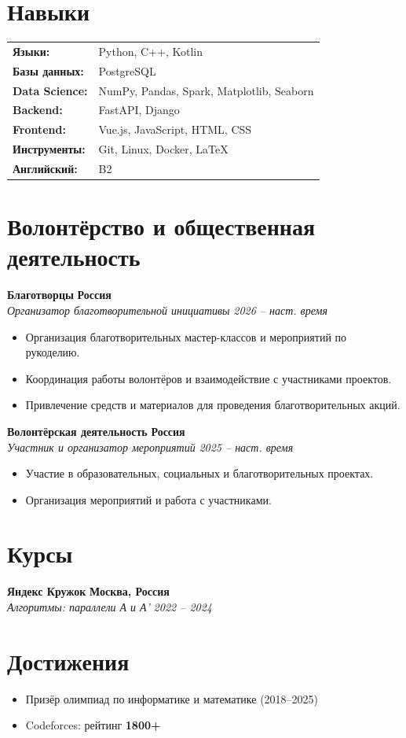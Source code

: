 \documentclass[11pt,a4paper]{article}
\newcommand{\cvevent}[4]{%
  \vspace{3pt}
  \noindent
  {\bfseries\large #1} \hfill {\bfseries #4}\\
  {\color{lighttext}\textit{#2}} \hfill {\color{lighttext}\textit{#3}}
  \vspace{1pt}
}
\begin{document}
\section{Навыки}

\begin{tabularx}{\textwidth}{@{}lX@{}}
  {\color{lighttext}\textbf{Языки:}} & Python, C++, Kotlin \\
  {\color{lighttext}\textbf{Базы данных:}} & PostgreSQL \\
  {\color{lighttext}\textbf{Data Science:}} & NumPy, Pandas, Spark, Matplotlib, Seaborn \\
  {\color{lighttext}\textbf{Backend:}} & FastAPI, Django \\
  {\color{lighttext}\textbf{Frontend:}} & Vue.js, JavaScript, HTML, CSS \\
  {\color{lighttext}\textbf{Инструменты:}} & Git, Linux, Docker, LaTeX \\
  {\color{lighttext}\textbf{Английский:}} & B2 \\
\end{tabularx}

\section{Волонтёрство и общественная деятельность}

\cvevent{Благотворцы}{Организатор благотворительной инициативы}{2026 -- наст. время}{Россия}
\begin{itemize}
  \item Организация благотворительных мастер-классов и мероприятий по рукоделию.
  \item Координация работы волонтёров и взаимодействие с участниками проектов.
  \item Привлечение средств и материалов для проведения благотворительных акций.
\end{itemize}

\cvevent{Волонтёрская деятельность}{Участник и организатор мероприятий}{2025 -- наст. время}{Россия}
\begin{itemize}
  \item Участие в образовательных, социальных и благотворительных проектах.
  \item Организация мероприятий и работа с участниками.
\end{itemize}

\section{Курсы}

\cvevent{Яндекс Кружок}{Алгоритмы: параллели А и А'}{2022 -- 2024}{Москва, Россия}

\section{Достижения}

\begin{itemize}
  \item Призёр олимпиад по информатике и математике (2018--2025)
  \item Codeforces: рейтинг \textbf{1800+}
\end{itemize}
\end{document}
